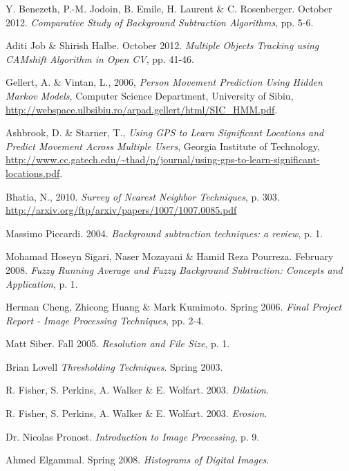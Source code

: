 \begin{thebibliography}{}


 Y. Benezeth, P.-M. Jodoin, B. Emile, H. Laurent \& C. Rosenberger. October 2012. \emph{Comparative Study of Background Subtraction Algorithms}, pp. 5-6.

 Aditi Job \& Shirish Halbe. October 2012. \emph{Multiple Objects Tracking using CAMshift Algorithm in Open CV}, pp. 41-46.

 Gellert, A. \& Vintan, L., 2006, \emph{Person Movement Prediction Using Hidden Markov Models}, Computer Science Department, University of Sibiu, \url{http://webspace.ulbsibiu.ro/arpad.gellert/html/SIC_HMM.pdf}.

 Ashbrook, D. \& Starner, T., \emph{Using GPS to Learn Significant Locations and Predict Movement Across Multiple Users}, Georgia Institute of Technology, \url{http://www.cc.gatech.edu/~thad/p/journal/using-gps-to-learn-significant-locations.pdf}.


 Bhatia, N., 2010. \emph{Survey of Nearest Neighbor Techniques}, p. 303. \url{http://arxiv.org/ftp/arxiv/papers/1007/1007.0085.pdf}


 Massimo Piccardi. 2004. \emph{Background subtraction techniques: a review}, p. 1.

 Mohamad Hoseyn Sigari, Naser Mozayani \& Hamid Reza Pourreza. February 2008. \emph{Fuzzy Running Average and Fuzzy Background Subtraction: Concepts and Application}, p. 1.

 Herman Cheng, Zhicong Huang \& Mark Kumimoto. Spring 2006. \emph{Final Project Report - Image Processing Techniques}, pp. 2-4.

 Matt Siber. Fall 2005. \emph{Resolution and File Size}, p. 1.

 Brian Lovell \emph{Thresholding Techniques}. Spring 2003.

 R. Fisher, S. Perkins, A. Walker \& E. Wolfart. 2003. \emph{Dilation}.

 R. Fisher, S. Perkins, A. Walker \& E. Wolfart. 2003. \emph{Erosion}.

 Dr. Nicolas Pronost. \emph{Introduction to Image Processing}, p. 9.

 Ahmed Elgammal. Spring 2008. \emph{Histograms of Digital Images}.








\end{thebibliography}
